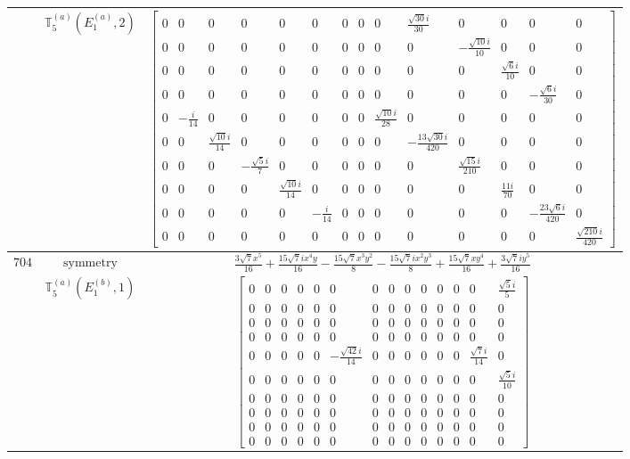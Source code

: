 \documentclass[fleqn,8pt,landscape]{jsarticle}
\begin{document}
\begin{longtable}{ccc}
$  $ & $ \mathbb{T}_{5}^{(a)}(E_{1}^{(a)},2) $ & $ \begin{bmatrix} 0 & 0 & 0 & 0 & 0 & 0 & 0 & 0 & 0 & \frac{\sqrt{30} i}{30} & 0 & 0 & 0 & 0 \\ 0 & 0 & 0 & 0 & 0 & 0 & 0 & 0 & 0 & 0 & - \frac{\sqrt{10} i}{10} & 0 & 0 & 0 \\ 0 & 0 & 0 & 0 & 0 & 0 & 0 & 0 & 0 & 0 & 0 & \frac{\sqrt{6} i}{10} & 0 & 0 \\ 0 & 0 & 0 & 0 & 0 & 0 & 0 & 0 & 0 & 0 & 0 & 0 & - \frac{\sqrt{6} i}{30} & 0 \\ 0 & - \frac{i}{14} & 0 & 0 & 0 & 0 & 0 & 0 & \frac{\sqrt{10} i}{28} & 0 & 0 & 0 & 0 & 0 \\ 0 & 0 & \frac{\sqrt{10} i}{14} & 0 & 0 & 0 & 0 & 0 & 0 & - \frac{13 \sqrt{30} i}{420} & 0 & 0 & 0 & 0 \\ 0 & 0 & 0 & - \frac{\sqrt{5} i}{7} & 0 & 0 & 0 & 0 & 0 & 0 & \frac{\sqrt{15} i}{210} & 0 & 0 & 0 \\ 0 & 0 & 0 & 0 & \frac{\sqrt{10} i}{14} & 0 & 0 & 0 & 0 & 0 & 0 & \frac{11 i}{70} & 0 & 0 \\ 0 & 0 & 0 & 0 & 0 & - \frac{i}{14} & 0 & 0 & 0 & 0 & 0 & 0 & - \frac{23 \sqrt{6} i}{420} & 0 \\ 0 & 0 & 0 & 0 & 0 & 0 & 0 & 0 & 0 & 0 & 0 & 0 & 0 & \frac{\sqrt{210} i}{420} \end{bmatrix} $ \\ \hline
$ 704 $ & $ \text{symmetry} $ & $ \frac{3 \sqrt{7} x^{5}}{16} + \frac{15 \sqrt{7} i x^{4} y}{16} - \frac{15 \sqrt{7} x^{3} y^{2}}{8} - \frac{15 \sqrt{7} i x^{2} y^{3}}{8} + \frac{15 \sqrt{7} x y^{4}}{16} + \frac{3 \sqrt{7} i y^{5}}{16} $ \\
$  $ & $ \mathbb{T}_{5}^{(a)}(E_{1}^{(b)},1) $ & $ \begin{bmatrix} 0 & 0 & 0 & 0 & 0 & 0 & 0 & 0 & 0 & 0 & 0 & 0 & 0 & \frac{\sqrt{5} i}{5} \\ 0 & 0 & 0 & 0 & 0 & 0 & 0 & 0 & 0 & 0 & 0 & 0 & 0 & 0 \\ 0 & 0 & 0 & 0 & 0 & 0 & 0 & 0 & 0 & 0 & 0 & 0 & 0 & 0 \\ 0 & 0 & 0 & 0 & 0 & 0 & 0 & 0 & 0 & 0 & 0 & 0 & 0 & 0 \\ 0 & 0 & 0 & 0 & 0 & - \frac{\sqrt{42} i}{14} & 0 & 0 & 0 & 0 & 0 & 0 & \frac{\sqrt{7} i}{14} & 0 \\ 0 & 0 & 0 & 0 & 0 & 0 & 0 & 0 & 0 & 0 & 0 & 0 & 0 & \frac{\sqrt{5} i}{10} \\ 0 & 0 & 0 & 0 & 0 & 0 & 0 & 0 & 0 & 0 & 0 & 0 & 0 & 0 \\ 0 & 0 & 0 & 0 & 0 & 0 & 0 & 0 & 0 & 0 & 0 & 0 & 0 & 0 \\ 0 & 0 & 0 & 0 & 0 & 0 & 0 & 0 & 0 & 0 & 0 & 0 & 0 & 0 \\ 0 & 0 & 0 & 0 & 0 & 0 & 0 & 0 & 0 & 0 & 0 & 0 & 0 & 0 \end{bmatrix} $ \\ \hline

\end{longtable}
\end{document}
